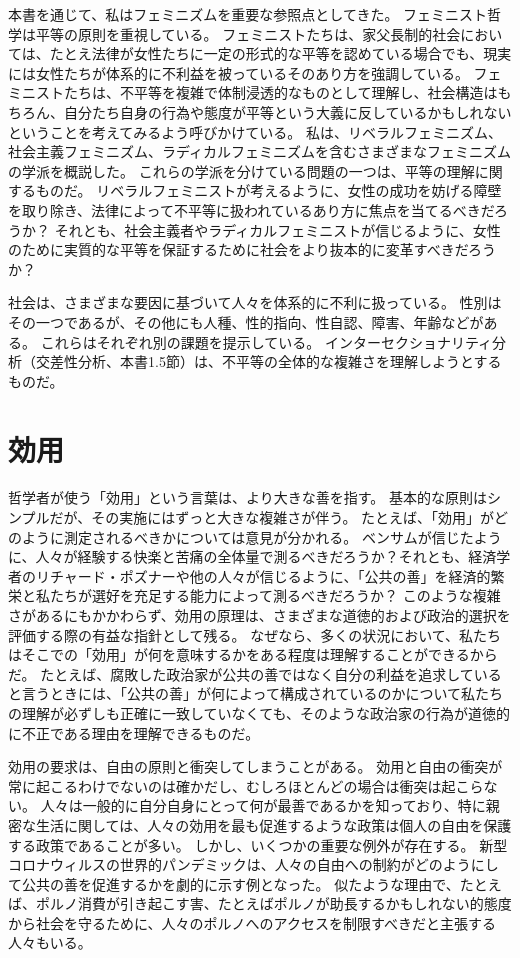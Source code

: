 \documentclass[paper=a4,book,openany]{jlreq}
\begin{document}
本書を通じて、私はフェミニズムを重要な参照点としてきた。
フェミニスト哲学は平等の原則を重視している。
フェミニストたちは、家父長制的社会においては、たとえ法律が女性たちに一定の形式的な平等を認めている場合でも、現実には女性たちが体系的に不利益を被っているそのあり方を強調している。
フェミニストたちは、不平等を複雑で体制浸透的なものとして理解し、社会構造はもちろん、自分たち自身の行為や態度が平等という大義に反しているかもしれないということを考えてみるよう呼びかけている。
私は、リベラルフェミニズム、社会主義フェミニズム、ラディカルフェミニズムを含むさまざまなフェミニズムの学派を概説した。
これらの学派を分けている問題の一つは、平等の理解に関するものだ。
リベラルフェミニストが考えるように、女性の成功を妨げる障壁を取り除き、法律によって不平等に扱われているあり方に焦点を当てるべきだろうか？ それとも、社会主義者やラディカルフェミニストが信じるように、女性のために実質的な平等を保証するために社会をより抜本的に変革すべきだろうか？

社会は、さまざまな要因に基づいて人々を体系的に不利に扱っている。
性別はその一つであるが、その他にも人種、性的指向、性自認、障害、年齢などがある。
これらはそれぞれ別の課題を提示している。
インターセクショナリティ分析（交差性分析、本書1.5節）は、不平等の全体的な複雑さを理解しようとするものだ。

\section{効用}

哲学者が使う「効用」という言葉は、より大きな善を指す。
基本的な原則はシンプルだが、その実施にはずっと大きな複雑さが伴う。
たとえば、「効用」がどのように測定されるべきかについては意見が分かれる。
ベンサムが信じたように、人々が経験する快楽と苦痛の全体量で測るべきだろうか？それとも、経済学者のリチャード・ポズナーや他の人々が信じるように、「公共の善」を経済的繁栄と私たちが選好を充足する能力によって測るべきだろうか？ このような複雑さがあるにもかかわらず、効用の原理は、さまざまな道徳的および政治的選択を評価する際の有益な指針として残る。
なぜなら、多くの状況において、私たちはそこでの「効用」が何を意味するかをある程度は理解することができるからだ。
たとえば、腐敗した政治家が公共の善ではなく自分の利益を追求していると言うときには、「公共の善」が何によって構成されているのかについて私たちの理解が必ずしも正確に一致していなくても、そのような政治家の行為が道徳的に不正である理由を理解できるものだ。

効用の要求は、自由の原則と衝突してしまうことがある。
効用と自由の衝突が常に起こるわけでないのは確かだし、むしろほとんどの場合は衝突は起こらない。
人々は一般的に自分自身にとって何が最善であるかを知っており、特に親密な生活に関しては、人々の効用を最も促進するような政策は個人の自由を保護する政策であることが多い。
しかし、いくつかの重要な例外が存在する。
新型コロナウィルスの世界的パンデミックは、人々の自由への制約がどのようにして公共の善を促進するかを劇的に示す例となった。
似たような理由で、たとえば、ポルノ消費が引き起こす害、たとえばポルノが助長するかもしれない的態度から社会を守るために、人々のポルノへのアクセスを制限すべきだと主張する人々もいる。
\end{document}
